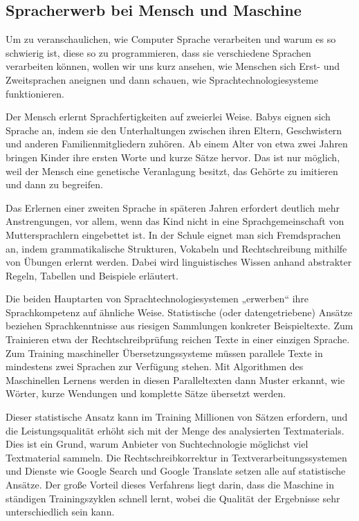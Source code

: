 \documentclass[]{../../metanetpaper}
\begin{document}
\begin{multicols}{2}
\subsection{Spracherwerb bei Mensch und Maschine}

Um zu veranschaulichen, wie Computer Sprache verarbeiten und warum es so schwierig ist, diese so zu programmieren, dass sie verschiedene Sprachen verarbeiten können, wollen wir uns kurz ansehen, wie Menschen sich Erst- und Zweitsprachen aneignen und dann schauen, wie Sprachtechnologiesysteme funktionieren.


Der Mensch erlernt Sprachfertigkeiten auf zweierlei Weise. Babys eignen sich Sprache an, indem sie den Unterhaltungen zwischen ihren Eltern, Geschwistern und anderen Familienmitgliedern zuhören. Ab einem Alter von etwa zwei Jahren bringen Kinder ihre ersten Worte und kurze Sätze hervor. Das ist nur möglich, weil der Mensch eine genetische Veranlagung besitzt, das Gehörte zu imitieren und dann zu begreifen. 

Das Erlernen einer zweiten Sprache in späteren Jahren erfordert deutlich mehr Anstrengungen, vor allem, wenn das Kind nicht in eine Sprachgemeinschaft von Muttersprachlern eingebettet ist. In der Schule eignet man sich Fremdsprachen  an, indem grammatikalische Strukturen, Vokabeln und Rechtschreibung mithilfe von Übungen erlernt werden. Dabei wird linguistisches Wissen anhand abstrakter Regeln, Tabellen und Beispiele erläutert. 

Die beiden Hauptarten von Sprachtechnologiesystemen „erwerben“ ihre Sprachkompetenz auf ähnliche Weise. Statistische (oder datengetriebene) Ansätze beziehen Sprachkenntnisse aus riesigen Sammlungen konkreter Beispieltexte. Zum Trainieren etwa der Rechtschreibprüfung  reichen Texte in einer einzigen Sprache. Zum Training maschineller Übersetzungssysteme  müssen parallele Texte in mindestens zwei Sprachen zur Verfügung stehen. Mit Algorithmen des Maschinellen Lernens werden in diesen Paralleltexten dann Muster erkannt, wie Wörter, kurze Wendungen und komplette Sätze übersetzt werden. 

Dieser statistische Ansatz kann im Training Millionen von Sätzen erfordern, und die Leistungsqualität erhöht sich mit der Menge des analysierten Textmaterials. Dies ist ein Grund, warum Anbieter von Suchtechnologie möglichst viel Textmaterial sammeln. Die Rechtschreibkorrektur in Textverarbeitungssystemen und Dienste wie Google Search und Google Translate setzen alle auf statistische Ansätze. Der große Vorteil dieses Verfahrens liegt darin, dass die Maschine in ständigen Trainingszyklen schnell lernt, wobei die Qualität der Ergebnisse sehr unterschiedlich sein kann.


\end{multicols}
\end{document}
